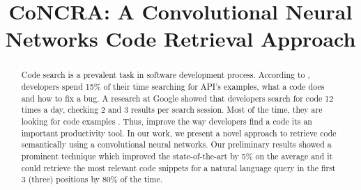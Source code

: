 \documentclass[sigconf]{acmart}
\begin{document}
\title{CoNCRA: A Convolutional Neural Networks Code Retrieval Approach}






\begin{abstract}
   Code search is a prevalent task in software development process. According to \cite{what-developers-search-for-on-the-web:xia:2017}, developers spend 15\% of their time searching for API's examples, what a code does and how to fix a bug. A research at Google showed that developers search for code 12 times a day, checking 2 and 3 results per search session. Most of the time, they are looking for code examples \citep{sadowski-how-developers-search-for-code-case-study:2015}. Thus, improve the way developers find a code its an important productivity tool. In our work, we present a novel approach to retrieve code semantically using a convolutional neural networks. Our preliminary results showed a prominent technique which improved the state-of-the-art \citep{cambronero-deep-code-search-2019} by 5\% on the average and it could retrieve the most relevant code snippets for a natural language query in the first 3 (three) positions by 80\% of the time. 
\end{abstract}
\end{document}
